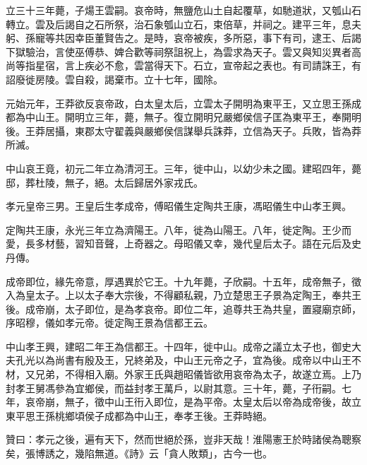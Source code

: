 \begin{pinyinscope}
立三十三年薨，子煬王雲嗣。哀帝時，無鹽危山土自起覆草，如馳道狀，又瓠山石轉立。雲及后謁自之石所祭，治石象瓠山立石，束倍草，并祠之。建平三年，息夫躬、孫寵等共因幸臣董賢告之。是時，哀帝被疾，多所惡，事下有司，逮王、后謁下獄驗治，言使巫傅恭、婢合歡等祠祭詛祝上，為雲求為天子。雲又與知災異者高尚等指星宿，言上疾必不愈，雲當得天下。石立，宣帝起之表也。有司請誅王，有詔廢徙房陵。雲自殺，謁棄市。立十七年，國除。

元始元年，王莽欲反哀帝政，白太皇太后，立雲太子開明為東平王，又立思王孫成都為中山王。開明立三年，薨，無子。復立開明兄嚴鄉侯信子匡為東平王，奉開明後。王莽居攝，東郡太守翟義與嚴鄉侯信謀舉兵誅莽，立信為天子。兵敗，皆為莽所滅。

中山哀王竟，初元二年立為清河王。三年，徙中山，以幼少未之國。建昭四年，薨邸，葬杜陵，無子，絕。太后歸居外家戎氏。

孝元皇帝三男。王皇后生孝成帝，傅昭儀生定陶共王康，馮昭儀生中山孝王興。

定陶共王康，永光三年立為濟陽王。八年，徙為山陽王。八年，徙定陶。王少而愛，長多材藝，習知音聲，上奇器之。母昭儀又幸，幾代皇后太子。語在元后及史丹傳。

成帝即位，緣先帝意，厚遇異於它王。十九年薨，子欣嗣。十五年，成帝無子，徵入為皇太子。上以太子奉大宗後，不得顧私親，乃立楚思王子景為定陶王，奉共王後。成帝崩，太子即位，是為孝哀帝。即位二年，追尊共王為共皇，置寢廟京師，序昭穆，儀如孝元帝。徙定陶王景為信都王云。

中山孝王興，建昭二年王為信都王。十四年，徙中山。成帝之議立太子也，御史大夫孔光以為尚書有殷及王，兄終弟及，中山王元帝之子，宜為後。成帝以中山王不材，又兄弟，不得相入廟。外家王氏與趙昭儀皆欲用哀帝為太子，故遂立焉。上乃封孝王舅馮參為宜鄉侯，而益封孝王萬戶，以尉其意。三十年，薨，子衎嗣。七年，哀帝崩，無子，徵中山王衎入即位，是為平帝。太皇太后以帝為成帝後，故立東平思王孫桃鄉頃侯子成都為中山王，奉孝王後。王莽時絕。

贊曰：孝元之後，遍有天下，然而世絕於孫，豈非天哉！淮陽憲王於時諸侯為聰察矣，張博誘之，幾陷無道。《詩》云「貪人敗類」，古今一也。


\end{pinyinscope}